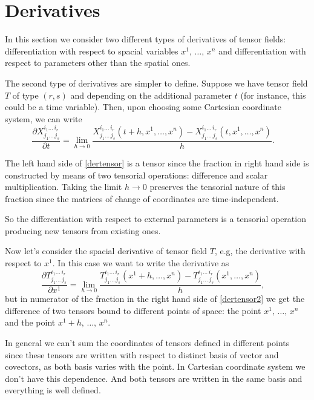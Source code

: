 \section{Derivatives}


    In this section we consider two different types of derivatives
of  tensor fields: differentiation with
respect to spacial variables $x^1,\,\dots,\,x^n$ and differentiation
with respect to parameters other than the spatial ones.

The second type of derivatives are simpler to define.  Suppose we have
tensor field $T$ of type $(r,s)$ and depending on the
additional parameter $t$ (for instance, this could be a time variable).
Then, upon choosing some Cartesian coordinate system, we can write
\begin{equation}
 \frac{\partial X^{i_1\ldots\,i_r}_{j_1\ldots\,j_s}}{\partial t}
=\lim_{h\to 0}\frac{X^{i_1\ldots\,i_r}_{j_1\ldots\,j_s}(t+h,x^1,
\dots,x^n)-X^{i_1\ldots\,i_r}_{j_1\ldots\,j_s}(t,x^1,\dots,x^n)}{h}.
\quad
\label{dertensor}
\end{equation}



The left hand side of \ref{dertensor} is a tensor since the fraction
in right hand side is constructed by means of two tensorial operations: difference and scalar multiplication. Taking the limit $h\to 0$  preserves the tensorial nature of this fraction since the
 matrices of change of coordinates are time-independent.

So the differentiation with respect to external
parameters  is a tensorial operation
producing new tensors from existing ones.

Now let's consider the spacial derivative of tensor field $T$, e.g, the derivative
with respect to $x^1$. 
In this case we want to write the derivative as
\begin{equation}
\frac{\partial T^{i_1\ldots\,i_r}_{j_1\ldots\,j_s}}{\partial x^1}
=\lim_{h\to 0}\frac{T^{i_1\ldots\,i_r}_{j_1\ldots\,j_s}(x^1+h,
\dots,x^n)-T^{i_1\ldots\,i_r}_{j_1\ldots\,j_s}(x^1,\dots,x^n)}{h},
\quad
\label{dertensor2} 
\end{equation}
but in numerator of the fraction in the right hand side of
\ref{dertensor2} we get the difference of two tensors bound to
different points of space:  the point $x^1,\,\dots,\,x^n$ and  the point $x^1+h,\,\dots,\,x^n$. 

In general we can't sum the coordinates of  tensors defined in different points since these  tensors are written with respect to distinct basis of vector and covectors, as both basis varies with the point.  
In Cartesian coordinate system we don't have this dependence. And both tensors are written in the same basis and everything is well defined.

